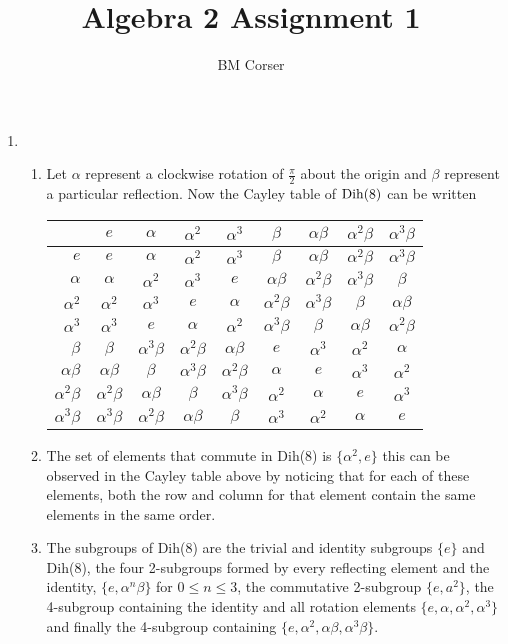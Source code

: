 \documentclass[10pt]{article}
\author{BM Corser}
\title{Algebra 2 Assignment 1}
\newcommand*{\E}{$e$}
\newcommand*{\A}{$\alpha$ }
\newcommand*{\As}{$\alpha^2$ }
\newcommand*{\Ac}{$\alpha^3$ }
\newcommand*{\B}{$\beta$ }
\newcommand*{\AB}{$\alpha\beta$ }
\newcommand*{\AsB}{$\alpha^2\beta$ }
\newcommand*{\AcB}{$\alpha^3\beta$ }
\begin{document}
  \maketitle 
  \begin{enumerate}
    \item
    \begin{enumerate}
        \item Let \A represent a clockwise rotation of $\frac{\pi}{2}$ about
          the origin and $\beta$ represent a particular reflection. Now the
          Cayley table of ${\rm Dih}(8)$ can be written

        \begin{tabular}{r|cccccccc}
               & \E   & \A   & \As  & \Ac  & \B   & \AB  & \AsB & \AcB \\ \hline
          \E   & \E   & \A   & \As  & \Ac  & \B   & \AB  & \AsB & \AcB \\
          \A   & \A   & \As  & \Ac  & \E   & \AB  & \AsB & \AcB & \B   \\
          \As  & \As  & \Ac  & \E   & \A   & \AsB & \AcB & \B   & \AB  \\
          \Ac  & \Ac  & \E   & \A   & \As  & \AcB & \B   & \AB  & \AsB \\
          \B   & \B   & \AcB & \AsB & \AB  & \E   & \Ac  & \As  & \A   \\
          \AB  & \AB  & \B   & \AcB & \AsB & \A   & \E   & \Ac  & \As  \\
          \AsB & \AsB & \AB  & \B   & \AcB & \As  & \A   & \E   & \Ac  \\
          \AcB & \AcB & \AsB & \AB  & \B   & \Ac  & \As  & \A   & \E   \\
        \end{tabular}
      \item The set of elements that commute in Dih(8) is $\{\alpha^2, e\}$
        this can be observed in the Cayley table above by noticing that for
        each of these elements, both the row and column for that element
        contain the same elements in the same order.
      \item The subgroups of Dih(8) are the trivial and identity subgroups
        $\{e\}$ and Dih(8), the four 2-subgroups formed by every reflecting
        element and the identity, $\{e, \alpha^n\beta\}$ for $0 \leq n \leq 3$,
        the commutative 2-subgroup $\{e, a^2\}$, the 4-subgroup containing the
        identity and all rotation elements $\{e, \alpha, \alpha^2, \alpha^3\}$
        and finally the 4-subgroup containing $\{e, \alpha^2, \alpha\beta,
        \alpha^3\beta\}$.


\end{enumerate}
\end{enumerate}
\end{document}
